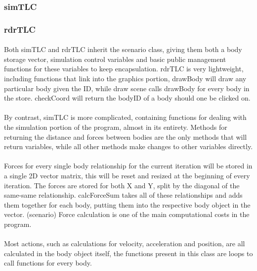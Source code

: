 \pagebreak
\subsubsection{simTLC}
\texttt{}

\subsubsection{rdrTLC}
\texttt{}

\paragraph{}
Both simTLC and rdrTLC inherit the scenario class, giving them both a body storage vector, simulation control variables and basic public management functions for these variables to keep encapsulation. rdrTLC is very lightweight, including functions that link into the graphics portion, drawBody will draw any particular body given the ID, while draw scene calls drawBody for every body in the store. checkCoord will return the bodyID of a body should one be clicked on.

\paragraph{}
By contrast, simTLC is more complicated, containing functions for dealing with the simulation portion of the program, almost in its entirety. Methods for returning the distance and forces between bodies are the only methods that will return variables, while all other methods make changes to other variables directly. 

\paragraph{}
Forces for every single body relationship for the current iteration will be stored in a single 2D vector matrix, this will be reset and resized at the beginning of every iteration. The forces are stored for both X and Y, split by the diagonal of the same-same relationship. calcForceSum takes all of these relationships and adds them together for each body, putting them into the respective body object in the vector. (scenario) Force calculation is one of the main computational costs in the program.

\paragraph{}
Most actions, such as calculations for velocity, acceleration and position, are all calculated in the body object itself, the functions present in this class are loops to call functions for every body.

